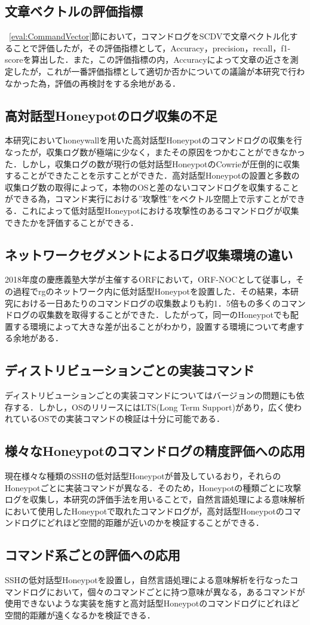 \subsection{文章ベクトルの評価指標}

~\ref{eval:CommandVector}節において，コマンドログをSCDVで文章ベクトル化することで評価したが，その評価指標として，Accuracy，precision，recall，f1-scoreを算出した．また，この評価指標の内，Accuracyによって文章の近さを測定したが，これが一番評価指標として適切か否かについての議論が本研究で行わなかった為，評価の再検討をする余地がある．

\subsection{高対話型Honeypotのログ収集の不足}
本研究においてhoneywallを用いた高対話型Honeypotのコマンドログの収集を行なったが，収集ログ数が極端に少なく，またその原因をつかむことができなかった．しかし，収集ログの数が現行の低対話型HoneypotのCowrieが圧倒的に収集することができたことを示すことができた．高対話型Honeypotの設置と多数の収集ログ数の取得によって，本物のOSと差のないコマンドログを収集することができる為，コマンド実行における”攻撃性”をベクトル空間上で示すことができる．これによって低対話型Honeypotにおける攻撃性のあるコマンドログが収集できたかを評価することができる．

\subsection{ネットワークセグメントによるログ収集環境の違い}
2018年度の慶應義塾大学が主催するORFにおいて，ORF-NOCとして従事し，その過程でrgのネットワーク内に低対話型Honeypotを設置した．その結果，本研究における一日あたりのコマンドログの収集数よりも約1．5倍もの多くのコマンドログの収集数を取得することができた．したがって，同一のHoneypotでも配置する環境によって大きな差が出ることがわかり，設置する環境について考慮する余地がある．

\subsection{ディストリビューションごとの実装コマンド}
ディストリビューションごとの実装コマンドについてはバージョンの問題にも依存する．しかし，OSのリリースにはLTS(Long Term Support)があり，広く使われているOSでの実装コマンドの検証は十分に可能である．

\subsection{様々なHoneypotのコマンドログの精度評価への応用}
現在様々な種類のSSHの低対話型Honeypotが普及しているおり，それらのHoneypotごとに実装コマンドが異なる．そのため，Honeypotの種類ごとに攻撃ログを収集し，本研究の評価手法を用いることで，自然言語処理による意味解析において使用したHoneypotで取れたコマンドログが，高対話型Honeypotのコマンドログにどれほど空間的距離が近いのかを検証することができる．

\subsection{コマンド系ごとの評価への応用}
SSHの低対話型Honeypotを設置し，自然言語処理による意味解析を行なったコマンドログにおいて，個々のコマンドごとに持つ意味が異なる，あるコマンドが使用できないような実装を施すと高対話型Honeypotのコマンドログにどれほど空間的距離が遠くなるかを検証できる．
